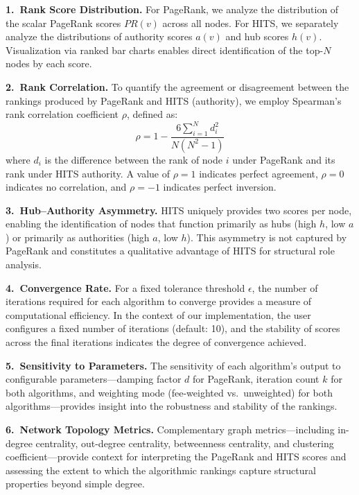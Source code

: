 \textbf{1.\ Rank Score Distribution.} For PageRank, we analyze the distribution of the scalar PageRank scores $PR(v)$ across all nodes. For HITS, we separately analyze the distributions of authority scores $a(v)$ and hub scores $h(v)$. Visualization via ranked bar charts enables direct identification of the top-$N$ nodes by each score.

\textbf{2.\ Rank Correlation.} To quantify the agreement or disagreement between the rankings produced by PageRank and HITS (authority), we employ Spearman's rank correlation coefficient $\rho$, defined as:
\begin{equation}
\label{eq:spearman}
\rho = 1 - \frac{6 \sum_{i=1}^{N} d_i^2}{N(N^2 - 1)}
\end{equation}
where $d_i$ is the difference between the rank of node $i$ under PageRank and its rank under HITS authority. A value of $\rho = 1$ indicates perfect agreement, $\rho = 0$ indicates no correlation, and $\rho = -1$ indicates perfect inversion.

\textbf{3.\ Hub--Authority Asymmetry.} HITS uniquely provides two scores per node, enabling the identification of nodes that function primarily as hubs (high $h$, low $a$) or primarily as authorities (high $a$, low $h$). This asymmetry is not captured by PageRank and constitutes a qualitative advantage of HITS for structural role analysis.

\textbf{4.\ Convergence Rate.} For a fixed tolerance threshold $\epsilon$, the number of iterations required for each algorithm to converge provides a measure of computational efficiency. In the context of our implementation, the user configures a fixed number of iterations (default: 10), and the stability of scores across the final iterations indicates the degree of convergence achieved.

\textbf{5.\ Sensitivity to Parameters.} The sensitivity of each algorithm's output to configurable parameters---damping factor $d$ for PageRank, iteration count $k$ for both algorithms, and weighting mode (fee-weighted vs.\ unweighted) for both algorithms---provides insight into the robustness and stability of the rankings.

\textbf{6.\ Network Topology Metrics.} Complementary graph metrics---including in-degree centrality, out-degree centrality, betweenness centrality, and clustering coefficient---provide context for interpreting the PageRank and HITS scores and assessing the extent to which the algorithmic rankings capture structural properties beyond simple degree.


